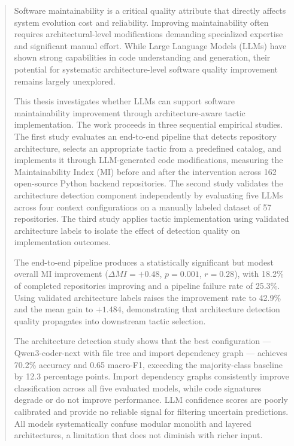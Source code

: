 \begin{abstract}
Software maintainability is a critical quality attribute that directly affects system evolution cost and reliability. Improving maintainability often requires architectural-level modifications demanding specialized expertise and significant manual effort. While Large Language Models (LLMs) have shown strong capabilities in code understanding and generation, their potential for systematic architecture-level software quality improvement remains largely unexplored.

This thesis investigates whether LLMs can support software maintainability improvement through architecture-aware tactic implementation. The work proceeds in three sequential empirical studies. The first study evaluates an end-to-end pipeline that detects repository architecture, selects an appropriate tactic from a predefined catalog, and implements it through LLM-generated code modifications, measuring the Maintainability Index (MI) before and after the intervention across 162 open-source Python backend repositories. The second study validates the architecture detection component independently by evaluating five LLMs across four context configurations on a manually labeled dataset of 57 repositories. The third study applies tactic implementation using validated architecture labels to isolate the effect of detection quality on implementation outcomes.

The end-to-end pipeline produces a statistically significant but modest overall MI improvement ($\overline{\Delta MI} = +0.48$, $p = 0.001$, $r = 0.28$), with 18.2\% of completed repositories improving and a pipeline failure rate of 25.3\%. Using validated architecture labels raises the improvement rate to 42.9\% and the mean gain to $+1.484$, demonstrating that architecture detection quality propagates into downstream tactic selection.

The architecture detection study shows that the best configuration — Qwen3-coder-next with file tree and import dependency graph — achieves 70.2\% accuracy and 0.65 macro-F1, exceeding the majority-class baseline by 12.3 percentage points. Import dependency graphs consistently improve classification across all five evaluated models, while code signatures degrade or do not improve performance. LLM confidence scores are poorly calibrated and provide no reliable signal for filtering uncertain predictions. All models systematically confuse modular monolith and layered architectures, a limitation that does not diminish with richer input.


\end{abstract}
